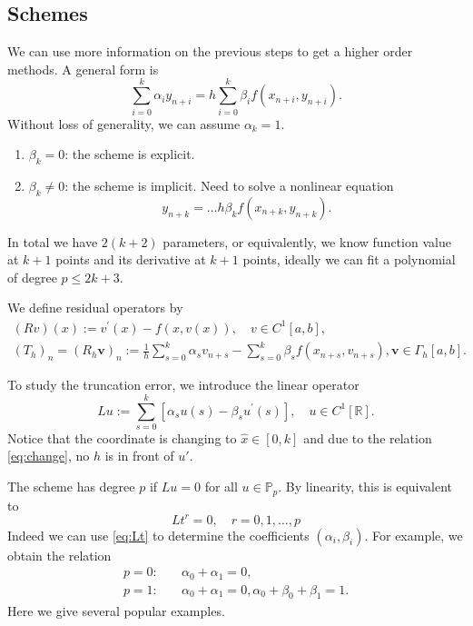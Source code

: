 \documentclass[10pt]{amsart}
\begin{document}
\subsection{Schemes}
We can use more information on the previous steps to get a higher order methods. A general form is
\begin{equation}\label{eq:multistep}
\sum_{i=0}^k \alpha_i y_{n+i} = h\sum_{i=0}^k \beta_i f(x_{n+i}, y_{n+i}).
\end{equation}
Without loss of generality, we can assume $\alpha_k = 1$. 
\begin{enumerate}[1.]
\item $\beta_k = 0$: the scheme is explicit. 
\item $\beta_k \neq 0$: the scheme is implicit. Need to solve a nonlinear equation 
$$
y_{n+k} = ... h\beta_k f(x_{n+k}, y_{n+k}). 
$$
\end{enumerate}
In total we have $2(k+2)$ parameters, or equivalently, we know function value at $k+1$ points and its derivative at $k+1$ points, ideally we can fit a polynomial of degree $p \leq 2k+3$. 

We define residual operators by
\begin{equation}
\begin{gathered}
(R {v})(x):={v}^{\prime}(x)-{f}(x, {v}(x)), \quad {v} \in C^1[a, b], \\
(T_h)_n = \left(R_h \boldsymbol{v}\right)_n:=\frac{1}{h} \sum_{s=0}^k \alpha_s {v}_{n+s}-\sum_{s=0}^k \beta_s {f}\left(x_{n+s}, {v}_{n+s}\right), \boldsymbol{v} \in \Gamma_h[a, b].
\end{gathered}
\end{equation}

To study the truncation error, we introduce the linear operator 
$$
L u:=\sum_{s=0}^k\left[\alpha_s u(s)-\beta_s u^{\prime}(s)\right], \quad u \in C^1[\mathbb{R}] .
$$
Notice that the coordinate is changing to $\hat x\in [0,k]$ and due to the relation \eqref{eq:change}, no $h$ is in front of $u'$. 

The scheme has degree $p$ if $L u=0$ for all $u \in \mathbb{P}_p$. By linearity, this is equivalent to
\begin{equation}\label{eq:Lt}
L t^r=0, \quad r=0,1, \ldots, p
\end{equation}
Indeed we can use \eqref{eq:Lt} to determine the coefficients $(\alpha_i, \beta_i)$. For example,  we obtain the relation
$$
\begin{aligned}
p= 0: & \quad \alpha_0 + \alpha_1 = 0,\\
p= 1: & \quad \alpha_0 + \alpha_1 = 0, \alpha_0 + \beta_0 + \beta_1 = 1.
\end{aligned}
$$
Here we give several popular examples.
\end{document}
